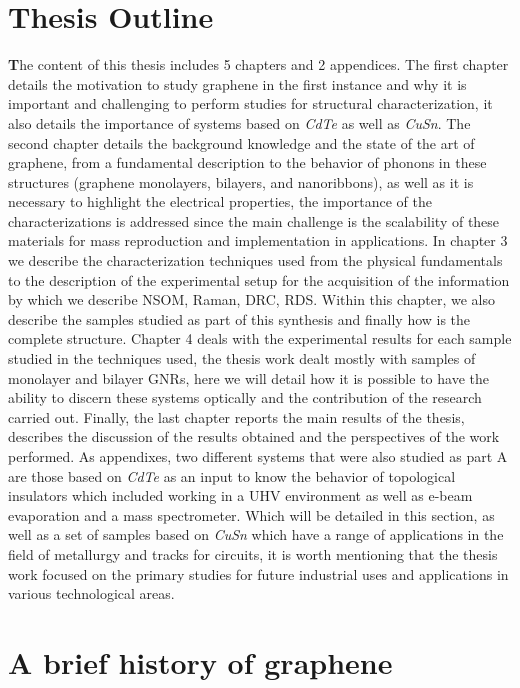 \section{Thesis Outline}
\vspace{-1cm}
\lettrine[lines=3, lraise=0.1, nindent=0mm, slope=0mm]{\textbf{T}}{}he content of this thesis includes 5 chapters and 2 appendices. The first chapter details the motivation to study graphene in the first instance and why it is important and challenging to perform studies for structural characterization, it also details the importance of systems based on \textit{CdTe} as well as \textit{CuSn}. The second chapter details the background knowledge and the state of the art of graphene, from a fundamental description to the behavior of phonons in these structures (graphene monolayers, bilayers, and nanoribbons), as well as it is necessary to highlight the electrical properties, the importance of the characterizations is addressed since the main challenge is the scalability of these materials for mass reproduction and implementation in applications.  In chapter 3 we describe the characterization techniques used from the physical fundamentals to the description of the experimental setup for the acquisition of the information by which we describe NSOM, Raman, DRC, RDS. Within this chapter, we also describe the samples studied as part of this synthesis and finally how is the complete structure. Chapter 4 deals with the experimental results for each sample studied in the techniques used, the thesis work dealt mostly with samples of monolayer and bilayer GNRs, here we will detail how it is possible to have the ability to discern these systems optically and the contribution of the research carried out. Finally, the last chapter reports the main results of the thesis,  describes the discussion of the results obtained and the perspectives of the work performed. As appendixes, two different systems that were also studied as part A are those based on \textit{CdTe }as an input to know the behavior of topological insulators which included working in a UHV environment as well as e-beam evaporation and a mass spectrometer. Which will be detailed in this section, as well as a set of samples based on \textit{CuSn} which have a range of applications in the field of metallurgy and tracks for circuits, it is worth mentioning that the thesis work focused on the primary studies for future industrial uses and applications in various technological areas. 


\section{A brief history of graphene}
\vspace{-1cm}

